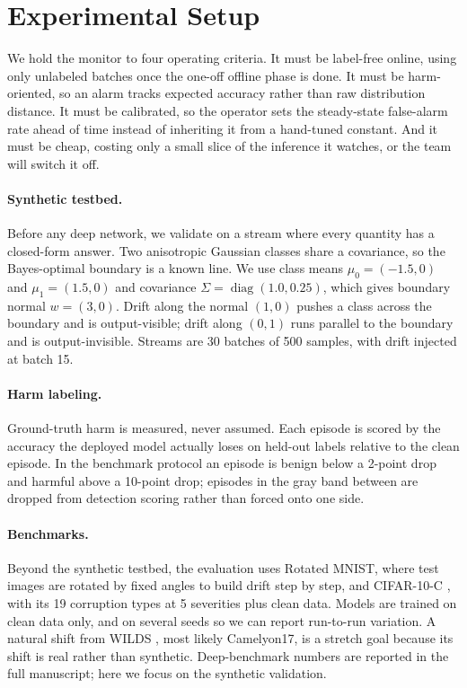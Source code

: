 \documentclass[sigconf,anonymous]{acmart}
\begin{document}
\section{Experimental Setup}
\label{sec:setup}

We hold the monitor to four operating criteria. It must be label-free online,
using only unlabeled batches once the one-off offline phase is done. It must
be harm-oriented, so an alarm tracks expected accuracy rather than raw
distribution distance. It must be calibrated, so the operator sets the
steady-state false-alarm rate ahead of time instead of inheriting it from a
hand-tuned constant. And it must be cheap, costing only a small slice of the
inference it watches, or the team will switch it off.

\paragraph{Synthetic testbed.}
Before any deep network, we validate on a stream where every quantity has a
closed-form answer. Two anisotropic Gaussian classes share a covariance, so
the Bayes-optimal boundary is a known line. We use class means $\mu_0 =
(-1.5, 0)$ and $\mu_1 = (1.5, 0)$ and covariance
$\Sigma = \operatorname{diag}(1.0, 0.25)$, which gives boundary normal
$w = (3, 0)$. Drift along the normal $(1,0)$ pushes a class across the
boundary and is output-visible; drift along $(0,1)$ runs parallel to the
boundary and is output-invisible. Streams are 30 batches of 500 samples, with
drift injected at batch 15.

\paragraph{Harm labeling.}
Ground-truth harm is measured, never assumed. Each episode is scored by the
accuracy the deployed model actually loses on held-out labels relative to the
clean episode. In the benchmark protocol an episode is benign below a 2-point
drop and harmful above a 10-point drop; episodes in the gray band between are
dropped from detection scoring rather than forced onto one side.

\paragraph{Benchmarks.}
Beyond the synthetic testbed, the evaluation uses Rotated MNIST, where test
images are rotated by fixed angles to build drift step by step, and CIFAR-10-C
\cite{hendrycks2019benchmarking}, with its 19 corruption types at 5 severities
plus clean data. Models are trained on clean data only, and on several seeds
so we can report run-to-run variation. A natural shift from WILDS
\cite{koh2021wilds}, most likely Camelyon17, is a stretch goal because its
shift is real rather than synthetic. Deep-benchmark numbers are reported in
the full manuscript; here we focus on the synthetic validation.
\end{document}
